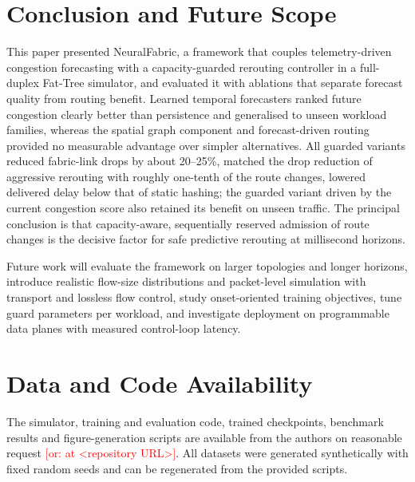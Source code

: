\documentclass[conference]{IEEEtran}
\newcommand{\tbd}[1]{\textcolor{red}{[#1]}}
\begin{document}
\section{Conclusion and Future Scope}
\label{sec:conclusion}
This paper presented NeuralFabric, a framework that couples telemetry-driven congestion forecasting with a capacity-guarded rerouting controller in a full-duplex Fat-Tree simulator, and evaluated it with ablations that separate forecast quality from routing benefit. Learned temporal forecasters ranked future congestion clearly better than persistence and generalised to unseen workload families, whereas the spatial graph component and forecast-driven routing provided no measurable advantage over simpler alternatives. All guarded variants reduced fabric-link drops by about 20--25\%, matched the drop reduction of aggressive rerouting with roughly one-tenth of the route changes, lowered delivered delay below that of static hashing; the guarded variant driven by the current congestion score also retained its benefit on unseen traffic. The principal conclusion is that capacity-aware, sequentially reserved admission of route changes is the decisive factor for safe predictive rerouting at millisecond horizons.

Future work will evaluate the framework on larger topologies and longer horizons, introduce realistic flow-size distributions and packet-level simulation with transport and lossless flow control, study onset-oriented training objectives, tune guard parameters per workload, and investigate deployment on programmable data planes with measured control-loop latency.

\section*{Data and Code Availability}
The simulator, training and evaluation code, trained checkpoints, benchmark results and figure-generation scripts are available from the authors on reasonable request \tbd{or: at <repository URL>}. All datasets were generated synthetically with fixed random seeds and can be regenerated from the provided scripts.
\end{document}
